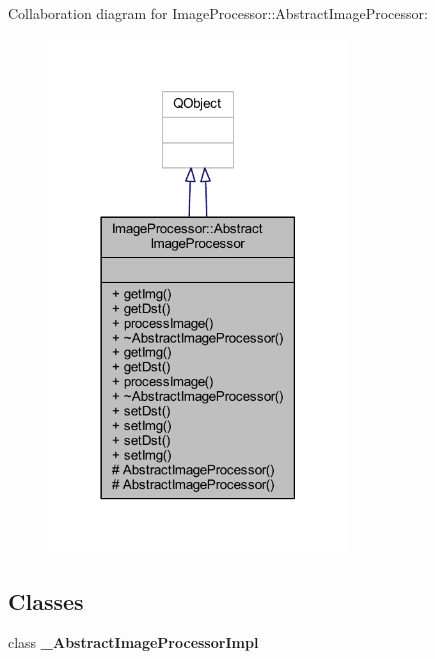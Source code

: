 Collaboration diagram for Image\+Processor\+:\+:Abstract\+Image\+Processor\+:\nopagebreak
\begin{figure}[H]
\begin{center}
\leavevmode
\includegraphics[width=225pt]{d2/d0a/class_image_processor_1_1_abstract_image_processor__coll__graph}
\end{center}
\end{figure}
\subsection*{Classes}
\begin{DoxyCompactItemize}
\item 
class {\bfseries \+\_\+\+Abstract\+Image\+Processor\+Impl}
\end{DoxyCompactItemize}

